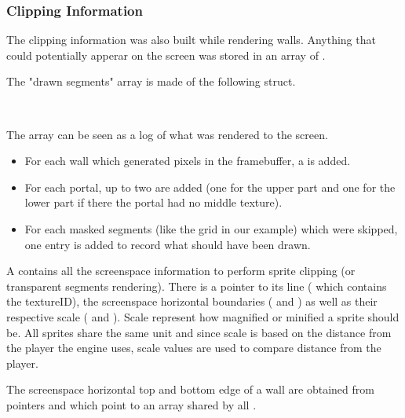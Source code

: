  \subsubsection{Clipping Information}
 The clipping information was also built while rendering walls. Anything that could potentially apperar on the screen was stored in an array of .\\
\par

The "drawn segments" array  is made of the following  struct.\\
\par
{}\\
\par
The array  can be seen as a log of what was rendered to the screen.\\
\begin{itemize} 
	\item For each wall which generated pixels in the framebuffer, a  is added.
	\item For each portal, up to two  are added (one for the upper part and one for the lower part if there the portal had no middle texture).
	\item For each masked segments (like the grid  in our example) which were skipped, one  entry is added to record what should have been drawn.
\end{itemize}
A  contains all the screenspace information to perform sprite clipping (or transparent segments rendering). There is a pointer to its line ( which contains the textureID), the screenspace horizontal boundaries ( and ) as well as their respective scale ( and ). Scale represent how magnified or minified a sprite should be. All sprites share the same unit and since scale is based on the distance from the player the engine uses, scale values are used to compare  distance from the player.\\
\par
The screenspace horizontal top and bottom edge of a wall are obtained from pointers  and  which point to an array shared by all .\\
\par
{} 
\pagebreak

